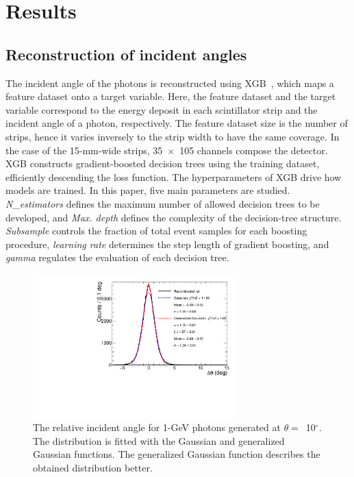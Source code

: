 \documentclass[12pt,times,draftclsnofoot,a4paper]{elsarticle}
\begin{document}
\section{Results}
\label{sec:res}
\subsection{Reconstruction of incident angles}
\label{sec:reco}

The incident angle of the photons is reconstructed using XGB~\cite{xgboost:2016}, which maps a feature dataset onto a target variable. Here, the feature dataset and the target variable correspond to the energy deposit in each scintillator strip and the incident angle of a photon, respectively. The feature dataset size is the number of strips, hence it varies inversely to the strip width to have the same coverage. In the case of the 15-mm-wide strips, 35~$\times$~105 channels compose the detector. XGB constructs gradient-boosted decision trees using the training dataset, efficiently descending the loss function. The hyperparameters of XGB drive how models are trained. In this paper, five main parameters are studied. \textit{N\_estimators} defines the maximum number of allowed decision trees to be developed, and \textit{Max. depth} defines the complexity of the decision-tree structure. \textit{Subsample} controls the fraction of total event samples for each boosting procedure, \textit{learning rate} determines the step length of gradient boosting, and \textit{gamma} regulates the evaluation of each decision tree.

\begin{figure}[!hbt]
\centering
\includegraphics[width=0.7\textwidth]{Fig3_fit_GG.pdf}
\caption{ The relative incident angle for 1-GeV photons generated at $\theta=$~10$^{\circ}$. The distribution is fitted with the Gaussian and generalized Gaussian functions. The generalized Gaussian function describes the obtained distribution better.}
\label{fig:angle_10degree}
\end{figure}
\end{document}
